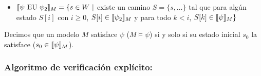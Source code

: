 \begin{itemize}
\item $\llbracket \psi \text{ EU }\psi_2 \rrbracket_{M} = \{s\in W~|$ existe un camino $S=\{s,\dots\}$ tal que para algún estado $S[i]$ con $i\geq 0$, $S[i]\in\llbracket \psi_2 \rrbracket_{M}$ y para todo $k < i$, $S[k]\in\llbracket \psi \rrbracket_{M} \}$
%
%
%
%
%
\end{itemize}

Decimos que un modelo $M$ satisface $\psi$ ($M\vDash \psi$) si y solo si su estado inicial $s_0$  la satisface ($s_0 \in\llbracket \psi \rrbracket_{M}$).

\newpage
\subsubsection{Algoritmo de verificación explícito:} 

